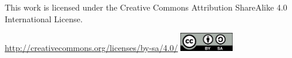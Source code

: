 \documentclass[12pt,a4paper]{elex2017}
\begin{document}
\medskip
\begin{minipage}[t]{\textwidth}
    \noindent This work is licensed under the Creative Commons Attribution
    ShareAlike 4.0 International License.
    \vspace{-2ex}
    \begin{center}%
        \url{http://creativecommons.org/licenses/by-sa/4.0/}\linebreak
        \includegraphics[width=2.33cm]{cc.png}%
    \end{center}
\end{minipage}
\end{document}
